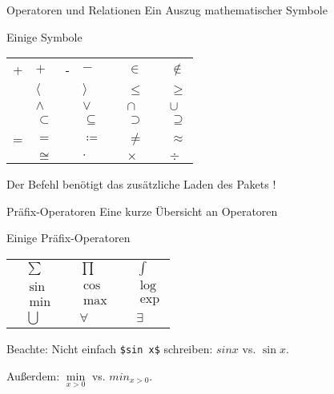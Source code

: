 \begin{frame}[fragile]{Operatoren und Relationen}
Ein Auszug mathematischer Symbole
\begin{block}{Einige Symbole}
\small\centering
\begin{tabular}{*{4}{|rl}|}\hline
+ & $+$ & - & $-$ &  & $\in$ &  & $\notin$ \\
 & $\langle$ &  & $\rangle$ &  & $\leq$ &  & $\geq$ \\
 & $\wedge$ &  & $\vee$ &  & $\cap$ &  & $\cup$ \\
 & $\subset$ &  & $\subseteq$ &  & $\supset$ &  & $\supseteq$ \\
= & $=$ &  & $\coloneqq$ &  & $\neq$ &  & $\approx$\\
 & $\cong$ &  & $\cdot$ &  & $\times$ &  & $\div$ \\ \hline
\end{tabular}
\end{block}\pause
Der Befehl  benötigt das zusätzliche Laden des Pakets !
\end{frame}

\begin{frame}[fragile]{Präfix-Operatoren}
Eine kurze Übersicht an Operatoren
\begin{block}{Einige Präfix-Operatoren}
\centering
\begin{tabular}{*{3}{|rl}|}\hline
{} & $\sum$ &  & $\prod$ &  & $\int$ \\
 & $\sin$ &  & $\cos$ &  & $\log$\\
 & $\min$ &  & $\max$ &  & $\exp$ \\
 & $\bigcup$ &  & $\forall$ &  & $\exists$ \\ \hline
\end{tabular}
\end{block}\pause
\alert{Beachte:} Nicht einfach \texttt{\$sin x\$} schreiben: $sin x$ vs. $\sin x$. 

\medskip\pause
Außerdem: $\min\limits_{x>0}$ vs. $min_{x>0}$. 
\end{frame}

